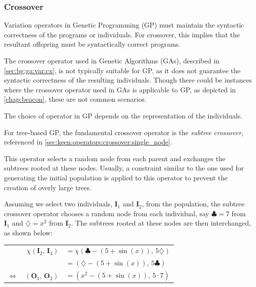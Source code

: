 \subsubsection{Crossover}
\label{sec:bg:gp:var:cx}
  Variation operators in Genetic Programming (GP) must maintain the syntactic 
  correctness of the programs or individuals.
  For crossover, this implies that the resultant offspring must be syntactically
  correct programs.

  The crossover operator used in Genetic Algorithms (GAs), described in 
  \vref{sec:bg:ga:var:cx}, is not typically suitable for GP, as it does not 
  guarantee the syntactic correctness of the resulting individuals.
  Though there could be instances where the crossover operator used in GAs is
  applicable to GP, as depicted in \vref{chap:beacon}, these are not common
  scenarios.

  The choice of operator in GP depends on the representation of the individuals.

  For tree-based GP, the fundamental crossover operator is the \emph{subtree 
  crossover}, referenced in \vref{sec:keen:operators:crossover:single_node}.

  This operator selects a random node from each parent and exchanges the 
  subtrees rooted at these nodes.
  Usually, a constraint similar to the one used for generating the initial
  population is applied to this operator to prevent the creation of overly large
  trees.

  Assuming we select two individuals, \(\mathbf{I}_1\) and \(\mathbf{I}_2\), 
  from the population, the subtree crossover operator chooses a random node from 
  each individual, say \(\clubsuit = 7\) from \(\mathbf{I}_1\) and 
  \(\diamondsuit = x^2\) from \(\mathbf{I}_2\).
  The subtrees rooted at these nodes are then interchanged, as shown below:

  \begin{table}[H]
    \centering
    \begin{tabular}{rrl}                    
        & \(\chi(\mathbf{I}_2,\,\mathbf{I}_4)\)
        & \(= \chi(\clubsuit - (5 + \sin(x)),\,5\diamondsuit)\)
      \\
        &   
        & \(= (\diamondsuit - (5 + \sin(x)),\,5\clubsuit)\)
      \\
      \(\Leftrightarrow\)
        & \((\mathbf{O}_1,\,\mathbf{O}_2)\)
        & \(= (x^2 - (5 + \sin(x)),\,5 \cdot 7)\)
    \end{tabular}
  \end{table}

